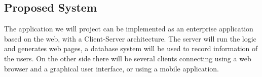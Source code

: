 			
			\subsection{Proposed System}
			The application we will project can be implemented as an enterprise application based on the web, with a Client-Server architecture. The server will run the logic and generates web pages, a database system will be used to record information of the users. On the other side there will be several clients connecting using a web browser and a graphical user interface, or using a mobile application.	
			